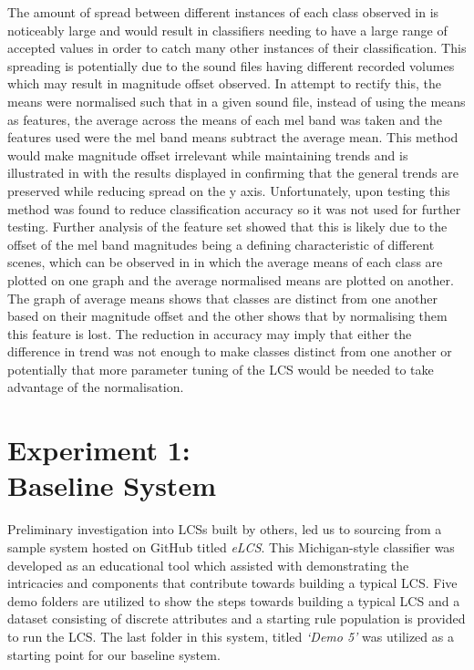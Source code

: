 \documentclass[11pt]{article}
\begin{document}
\begin{multicols}{2}
The amount of spread between different instances of each class observed in 
is noticeably large and would result in classifiers needing to have a large range of accepted values in order to catch many other instances of their classification. This spreading is potentially due to the sound files having different recorded volumes which may result in magnitude offset observed. In attempt to rectify this, the means were normalised such that in a given sound file, instead of using the means as features, the average across the means of each mel band was taken and the features used were the mel band means subtract the average mean. This method would make magnitude offset irrelevant while maintaining trends and is illustrated in 
with the results displayed in 
confirming that the general trends are preserved while reducing spread on the y axis. Unfortunately, upon testing this method was found to reduce classification accuracy so it was not used for further testing. Further analysis of the feature set showed that this is likely due to the offset of the mel band magnitudes being a defining characteristic of different scenes, which can be observed in 
in which the average means of each class are plotted on one graph and the average normalised means are plotted on another. The graph of average means shows that classes are distinct from one another based on their magnitude offset and the other shows that by normalising them this feature is lost. The reduction in accuracy may imply that either the difference in trend was not enough to make classes distinct from one another or potentially that more parameter tuning of the LCS would be needed to take advantage of the normalisation.






\section{Experiment 1:\\Baseline System}
\label{sec:exp1}

Preliminary investigation into LCSs built by others, led us to sourcing from a sample system hosted on GitHub titled \textit{eLCS}. This Michigan-style classifier was developed as an educational tool which assisted with demonstrating the intricacies and components that contribute towards building a typical LCS. Five demo folders are utilized to show the steps towards building a typical LCS and a dataset consisting of discrete attributes and a starting rule population is provided to run the LCS. The last folder in this system, titled \textit{‘Demo 5’} was utilized as a starting point for our baseline system.






\end{multicols}
\end{document}
